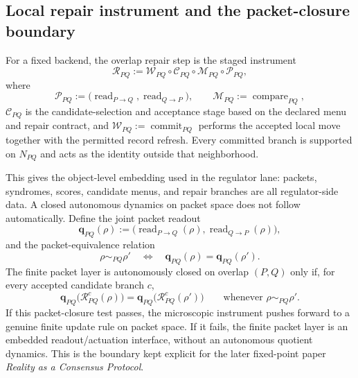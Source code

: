 \documentclass[11pt]{article}
\begin{document}
\subsection{Local repair instrument and the packet-closure boundary}

For a fixed backend, the overlap repair step is the staged instrument
\begin{equation}
\mathcal R_{PQ}
:=
\mathcal W_{PQ}\circ \mathcal C_{PQ}\circ \mathcal M_{PQ}\circ \mathcal P_{PQ},
\end{equation}
where
\begin{equation}
\mathcal P_{PQ}:=\bigl(\operatorname{read}_{P\to Q},\operatorname{read}_{Q\to P}\bigr),
\qquad
\mathcal M_{PQ}:=\operatorname{compare}_{PQ},
\end{equation}
$\mathcal C_{PQ}$ is the candidate-selection and acceptance stage based on the declared menu and
repair contract, and $\mathcal W_{PQ}:=\operatorname{commit}_{PQ}$ performs the accepted local
move together with the permitted record refresh. Every committed branch is supported on $N_{PQ}$
and acts as the identity outside that neighborhood.

This gives the object-level embedding used in the regulator lane: packets, syndromes,
scores, candidate menus, and repair branches are all regulator-side data. A closed autonomous
dynamics on packet space does not follow automatically. Define the joint
packet readout
\begin{equation}
\mathbf q_{PQ}(\rho)
:=
\bigl(
\operatorname{read}_{P\to Q}(\rho),
\operatorname{read}_{Q\to P}(\rho)
\bigr),
\end{equation}
and the packet-equivalence relation
\begin{equation}
\rho\sim_{PQ}\rho'
\quad\Longleftrightarrow\quad
\mathbf q_{PQ}(\rho)=\mathbf q_{PQ}(\rho').
\end{equation}
The finite packet layer is autonomously closed on overlap $(P,Q)$ only if, for every accepted
candidate branch $c$,
\begin{equation}
\mathbf q_{PQ}\bigl(\mathcal R_{PQ}^{c}(\rho)\bigr)
=
\mathbf q_{PQ}\bigl(\mathcal R_{PQ}^{c}(\rho')\bigr)
\qquad
\text{whenever }\rho\sim_{PQ}\rho'.
\end{equation}
If this packet-closure test passes, the microscopic instrument pushes forward to a genuine
finite update rule on packet space. If it fails, the finite packet layer is an embedded
readout/actuation interface, without an autonomous quotient dynamics. This is the boundary kept
explicit for the later fixed-point paper \emph{Reality as a Consensus Protocol}.
\end{document}

